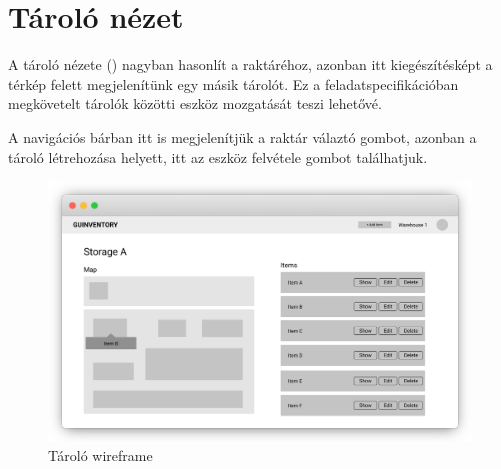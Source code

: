 \section{Tároló nézet}
A tároló nézete () nagyban hasonlít a raktáréhoz, azonban itt kiegészítésképt a térkép felett megjelenítünk egy másik tárolót.
Ez a feladatspecifikációban megkövetelt tárolók közötti eszköz mozgatását teszi lehetővé.

A navigációs bárban itt is megjelenítjük a raktár válaztó gombot, azonban a tároló létrehozása helyett, itt az eszköz felvétele gombot találhatjuk.

\begin{figure}[!ht]
  \centering
  \includegraphics[width=150mm, keepaspectratio]{figures/wireframes/frame_storage.png}
  \caption{Tároló wireframe}
  \label{fig:StorageWireframe}
\end{figure}
  